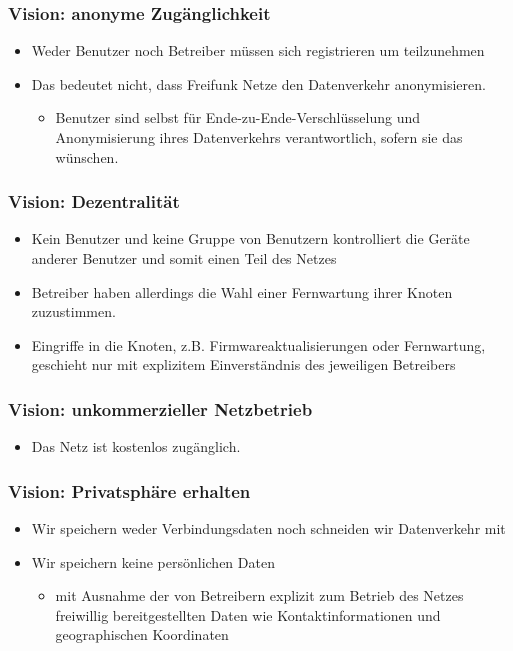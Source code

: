 \documentclass[handout, 10pt]{beamer}
\begin{document}
\begin{frame}
	\frametitle{Vision: anonyme Zugänglichkeit}
	
	\begin{itemize}[<+->]
		\item Weder Benutzer noch Betreiber müssen sich registrieren um teilzunehmen
		\item Das bedeutet nicht, dass Freifunk Netze den Datenverkehr anonymisieren.
			\begin{itemize}
				\item Benutzer sind selbst für Ende-zu-Ende-Verschlüsselung und Anonymisierung ihres Datenverkehrs verantwortlich, sofern sie das wünschen.
			\end{itemize}
	\end{itemize}
\end{frame}

\begin{frame}
	\frametitle{Vision: Dezentralität}
	
	\begin{itemize}[<+->]
		\item Kein Benutzer und keine Gruppe von Benutzern kontrolliert die Geräte anderer Benutzer und somit einen Teil des Netzes
		\item Betreiber haben allerdings die Wahl einer Fernwartung ihrer Knoten zuzustimmen.
		\item Eingriffe in die Knoten, z.B. Firmwareaktualisierungen oder Fernwartung, geschieht nur mit explizitem Einverständnis des jeweiligen Betreibers
	\end{itemize}
\end{frame}

\begin{frame}
	\frametitle{Vision: unkommerzieller Netzbetrieb}
	
	\begin{itemize}[<+->]
		\item Das Netz ist kostenlos zugänglich.
	\end{itemize}
\end{frame}

\begin{frame}
	\frametitle{Vision: Privatsphäre erhalten}
	
	\begin{itemize}[<+->]
		\item Wir speichern weder Verbindungsdaten noch schneiden wir Datenverkehr mit
		\item Wir speichern keine persönlichen Daten
		\begin{itemize}
			\item mit Ausnahme der von Betreibern explizit zum Betrieb des Netzes freiwillig bereitgestellten Daten wie Kontaktinformationen und geographischen Koordinaten
		\end{itemize}
	\end{itemize}
\end{frame}
\end{document}
